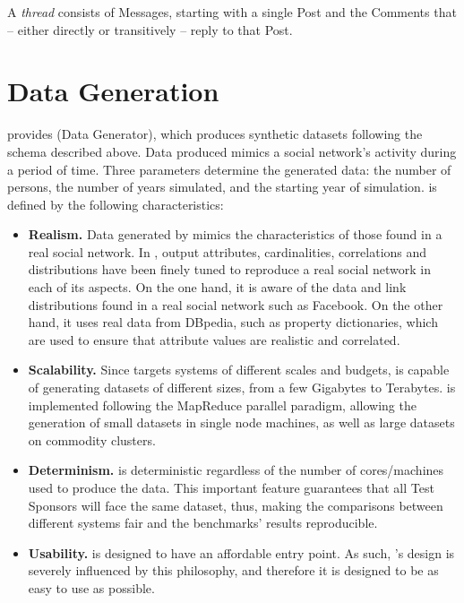 A \emph{thread} consists of Messages, starting with a single Post and the Comments that -- either directly or transitively -- reply to that Post.

\section{Data Generation}
\label{sec:data_generation}

\ldbcsnb provides \datagen (Data Generator), which produces synthetic
datasets following the schema described above. Data
produced mimics a social network's activity during a period of time. Three
parameters determine the generated data: the number of persons, the number of
years simulated, and the starting year of simulation. \datagen is defined by the
following characteristics:

\begin{itemize}
    \item \textbf{Realism.} Data generated by \datagen mimics the
        characteristics of those found in a real social network. In \datagen,
        output attributes, cardinalities, correlations and distributions have
        been finely tuned to reproduce a real social network in each of its
        aspects. On the one hand, it is aware of the  data and link distributions
        found in a real social network such as Facebook. On the other hand, it
        uses real data from DBpedia, such as property dictionaries, which are
        used to ensure that attribute values are realistic and correlated.
    \item \textbf{Scalability.} Since \ldbcsnb targets systems of different
        scales and budgets, \datagen is capable of generating datasets of
        different sizes, from a few Gigabytes to Terabytes. \datagen is
        implemented following the MapReduce parallel paradigm, allowing the
        generation of small datasets in single node machines, as well as large
        datasets on commodity clusters.
    \item \textbf{Determinism.} \datagen is deterministic regardless of the number
        of cores/machines used to produce the data. This important feature
        guarantees that all Test Sponsors will face the same dataset,
        thus, making the comparisons between different systems fair and the
        benchmarks' results reproducible.
    \item \textbf{Usability.} \ldbcsnb is designed to have an affordable entry
        point. As such, \datagen's design is  severely influenced by this
        philosophy, and therefore it is designed to be as easy to use as
        possible.
\end{itemize}


